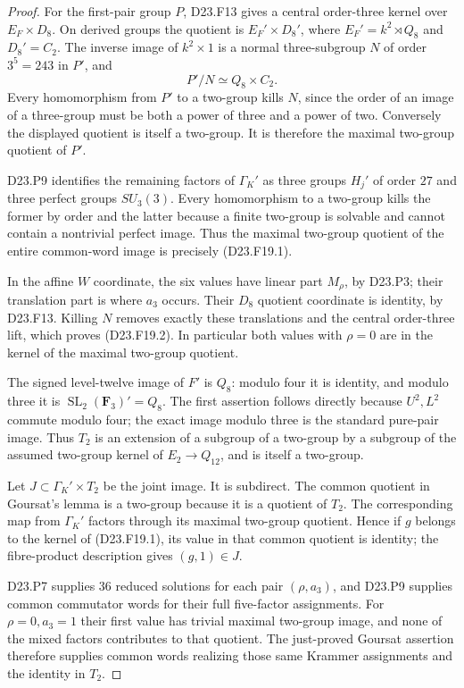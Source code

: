 \begin{proof}
For the first-pair group $P$, D23.F13 gives
a central order-three kernel over
$E_F\times D_8$. On derived groups the quotient
is $E_F'\times D_8'$, where
$E_F'=k^2\rtimes Q_8$ and $D_8'=C_2$.
The inverse image of $k^2\times1$ is a normal
three-subgroup $N$ of order $3^5=243$ in $P'$,
and
\[
 P'/N\simeq Q_8\times C_2.
\]
Every homomorphism from $P'$ to a two-group
kills $N$, since the order of an image of a
three-group must be both a power of three
and a power of two. Conversely the displayed
quotient is itself a two-group. It is therefore
the maximal two-group quotient of $P'$.

D23.P9 identifies the remaining factors of
$\Gamma_K'$ as three groups $H_j'$ of order
$27$ and three perfect groups $SU_3(3)$.
Every homomorphism to a two-group kills the
former by order and the latter because a
finite two-group is solvable and cannot
contain a nontrivial perfect image. Thus
the maximal two-group quotient of the
entire common-word image is precisely
(D23.F19.1).

In the affine $W$ coordinate, the six values
have linear part $M_\rho$, by D23.P3; their
translation part is where $a_3$ occurs.
Their $D_8$ quotient coordinate is identity,
by D23.F13. Killing $N$ removes exactly
these translations and the central
order-three lift, which proves (D23.F19.2).
In particular both values with $\rho=0$
are in the kernel of the maximal two-group
quotient.

The signed level-twelve image of $F'$
is $Q_8$: modulo four it is identity,
and modulo three it is
$\operatorname{SL}_2(\mathbf F_3)'=Q_8$.
The first assertion follows directly
because $U^2,L^2$ commute modulo four;
the exact image modulo three is the
standard pure-pair image. Thus $T_2$ is
an extension of a subgroup of a two-group
by a subgroup of the assumed two-group
kernel of $E_2\to Q_{12}$, and is itself
a two-group.

Let $J\subset\Gamma_K'\times T_2$ be
the joint image. It is subdirect. The
common quotient in Goursat's lemma is
a two-group because it is a quotient
of $T_2$. The corresponding map from
$\Gamma_K'$ factors through its maximal
two-group quotient. Hence if $g$ belongs
to the kernel of (D23.F19.1), its value
in that common quotient is identity;
the fibre-product description gives
$(g,1)\in J$.

D23.P7 supplies $36$ reduced solutions
for each pair $(\rho,a_3)$, and D23.P9
supplies common commutator words for
their full five-factor assignments.
For $\rho=0,a_3=1$ their first value
has trivial maximal two-group image,
and none of the mixed factors contributes
to that quotient. The just-proved
Goursat assertion therefore supplies
common words realizing those same
Krammer assignments and the identity
in $T_2$.


\end{proof}
